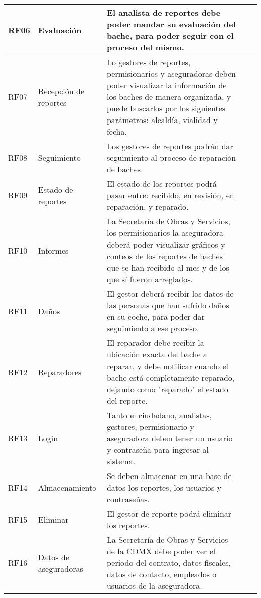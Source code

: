 \begin{longtable}{|m{1.5cm}|m{3cm}|m{5cm}|m{2cm}| m{2cm}|}
        RF06 & Evaluación & El analista de reportes debe poder mandar su evaluación del bache, para poder seguir con el proceso del mismo.\\ \hline
        
        RF07 & Recepción de reportes & Lo gestores de reportes, permisionarios y aseguradoras deben poder visualizar la información de los baches de manera organizada, y puede buscarlos por los siguientes parámetros: alcaldía, vialidad y fecha.  \\ \hline
        
        RF08 & Seguimiento & Los gestores de reportes podrán dar seguimiento al proceso de reparación de baches. \\ \hline
        
        RF09 & Estado de reportes & El estado de los reportes podrá pasar entre: recibido, en revisión, en reparación, y reparado.   \\ \hline
        
        RF10 & Informes & La Secretaría de Obras y Servicios, los permisionarios la aseguradora deberá poder visualizar gráficos y conteos de los reportes de baches que se han recibido al mes y de los que sí fueron arreglados. \\ \hline
        
        RF11 & Daños & El gestor deberá recibir los datos de las personas que han sufrido daños en su coche, para poder dar seguimiento a ese proceso. \\\hline
        
        RF12 & Reparadores & El reparador debe recibir la ubicación exacta del bache a reparar, y debe notificar cuando el bache está completamente reparado, dejando como "reparado" el estado del reporte. \\\hline
        
        RF13 & Login & Tanto el ciudadano, analistas, gestores, permisionario y aseguradora deben tener un usuario y contraseña para ingresar al sistema. \\ \hline
        
        RF14 & Almacenamiento & Se deben almacenar en una base de datos los reportes,  los usuarios y contraseñas. \\ \hline
        
        RF15 & Eliminar & El gestor de reporte podrá eliminar los reportes. \\ \hline
        
        RF16 & Datos de aseguradoras & La Secretaría de Obras y Servicios de la CDMX debe poder ver el periodo del contrato, datos fiscales, datos de contacto, empleados o usuarios de la aseguradora.  \\ \hline
        

\end{longtable}
